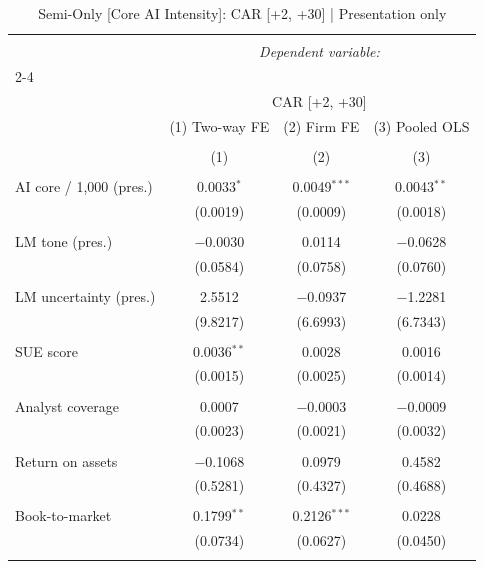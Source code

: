 
\begin{table}[!htbp] \centering 
  \caption{Semi-Only [Core AI Intensity]: CAR [+2, +30]  |  Presentation only} 
  \label{} 
\begin{tabular}{@{\extracolsep{5pt}}lccc} 
\\[-1.8ex]\hline 
\hline \\[-1.8ex] 
 & \multicolumn{3}{c}{\textit{Dependent variable:}} \\ 
\cline{2-4} 
\\[-1.8ex] & \multicolumn{3}{c}{CAR [+2, +30]} \\ 
 & (1) Two-way FE & (2) Firm FE & (3) Pooled OLS \\ 
\\[-1.8ex] & (1) & (2) & (3)\\ 
\hline \\[-1.8ex] 
 AI core / 1,000 (pres.) & 0.0033$^{*}$ & 0.0049$^{***}$ & 0.0043$^{**}$ \\ 
  & (0.0019) & (0.0009) & (0.0018) \\ 
  & & & \\ 
 LM tone (pres.) & $-$0.0030 & 0.0114 & $-$0.0628 \\ 
  & (0.0584) & (0.0758) & (0.0760) \\ 
  & & & \\ 
 LM uncertainty (pres.) & 2.5512 & $-$0.0937 & $-$1.2281 \\ 
  & (9.8217) & (6.6993) & (6.7343) \\ 
  & & & \\ 
 SUE score & 0.0036$^{**}$ & 0.0028 & 0.0016 \\ 
  & (0.0015) & (0.0025) & (0.0014) \\ 
  & & & \\ 
 Analyst coverage & 0.0007 & $-$0.0003 & $-$0.0009 \\ 
  & (0.0023) & (0.0021) & (0.0032) \\ 
  & & & \\ 
 Return on assets & $-$0.1068 & 0.0979 & 0.4582 \\ 
  & (0.5281) & (0.4327) & (0.4688) \\ 
  & & & \\ 
 Book-to-market & 0.1799$^{**}$ & 0.2126$^{***}$ & 0.0228 \\ 
  & (0.0734) & (0.0627) & (0.0450) \\ 
  & & & \\ 

\end{tabular}
\end{table}

